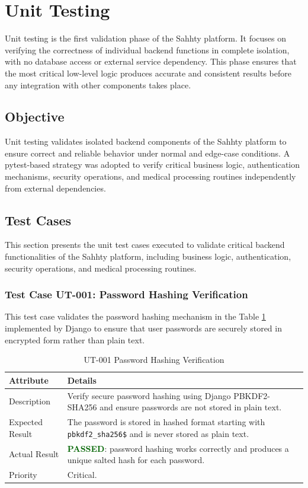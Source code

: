\section{Unit Testing}

Unit testing is the first validation phase of the Sahhty platform. It focuses on verifying the correctness of individual backend functions in complete isolation, with no database access or external service dependency. This phase ensures that the most critical low-level logic produces accurate and consistent results before any integration with other components takes place.

\subsection{Objective}
Unit testing validates isolated backend components of the Sahhty platform to ensure correct and reliable behavior under normal and edge-case conditions. A pytest-based strategy was adopted to verify critical business logic, authentication mechanisms, security operations, and medical processing routines independently from external dependencies.

\subsection{Test Cases}
This section presents the unit test cases executed to validate critical backend functionalities of the Sahhty platform, including business logic, authentication, security operations, and medical processing routines.

\subsubsection{Test Case UT-001: Password Hashing Verification}

This test case validates the password hashing mechanism in the Table \ref{tab:ut001} implemented by Django to ensure that user passwords are securely stored in encrypted form rather than plain text.

\begin{table}[H]
\centering
\caption{UT-001 Password Hashing Verification}
\label{tab:ut001}
\renewcommand{\arraystretch}{1.3}

\begin{tabular}{|p{2cm}|p{13cm}|}
\hline
\rowcolor{gray!20}
\textbf{Attribute} & \textbf{Details} \\
\hline
Description & Verify secure password hashing using Django PBKDF2-SHA256 and ensure passwords are not stored in plain text. \\
\hline
Expected Result & The password is stored in hashed format starting with \texttt{pbkdf2\_sha256\$} and is never stored as plain text. \\
\hline
Actual Result & \textbf{\textcolor{darkgreen}{PASSED}}: password hashing works correctly and produces a unique salted hash for each password. \\
\hline
Priority & Critical. \\
\hline
\end{tabular}
\end{table}

